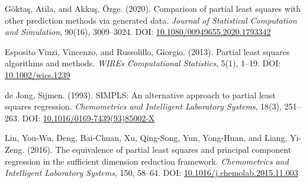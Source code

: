 \documentclass[11pt,twoside,a4paper]{article}
\begin{document}
\begin{thebibliography}{99}
Göktaş, Atila, and Akkuş, Özge. (2020). Comparison of partial least squares with other prediction methods via generated data. \textit{Journal of Statistical Computation and Simulation}, 90(16), 3009–3024. DOI: \href{https://doi.org/10.1080/00949655.2020.1793342}{10.1080/00949655.2020.1793342}

Esposito Vinzi, Vincenzo, and Russolillo, Giorgio. (2013). Partial least squares algorithms and methods. \textit{WIREs Computational Statistics}, 5(1), 1–19. DOI: \href{https://doi.org/10.1002/wics.1239}{10.1002/wics.1239}

de Jong, Sijmen. (1993). SIMPLS: An alternative approach to partial least squares regression. \textit{Chemometrics and Intelligent Laboratory Systems}, 18(3), 251–263. DOI: \href{https://doi.org/10.1016/0169-7439(93)85002-X}{10.1016/0169-7439(93)85002-X}

Lin, You-Wu, Deng, Bai-Chuan, Xu, Qing-Song, Yun, Yong-Huan, and Liang, Yi-Zeng. (2016). The equivalence of partial least squares and principal component regression in the sufficient dimension reduction framework. \textit{Chemometrics and Intelligent Laboratory Systems}, 150, 58–64. DOI: \href{https://doi.org/10.1016/j.chemolab.2015.11.003}{10.1016/j.chemolab.2015.11.003}

\end{thebibliography}
\end{document}
